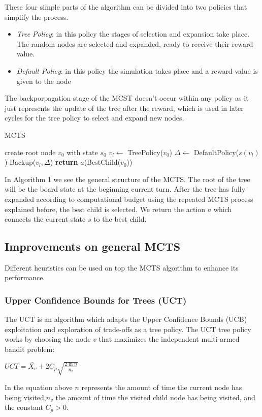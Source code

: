 \documentclass{ba-kecs}
\begin{document}
These four simple parts of the algorithm can be divided into two policies that simplify the process.
\begin{itemize}
\item \textit{Tree Policy}: in this policy the stages of selection and expansion take place. The random nodes are selected and expanded, ready to receive their reward value.
\item \textit{Default Policy}: in this policy the simulation takes place and a reward value is given to the node 
\end{itemize}
The backporpagation stage of the MCST doesn't occur within any policy as it just represents the update of the tree after the reward, which is used in later cycles for the tree policy to select and expand new nodes.

\begin{algorithm}
    \caption{MCTS}
    \label{MCTS}
    \begin{algorithmic}
            \State create root node $v_0$ with state $s_0$
                \State $v_l \gets$ TreePolicy($v_0$)
                \State $ \Delta \gets$ DefaultPolicy($s(v_l)$)
                \State Backup($v_l, \Delta$)
            \EndWhile\label{}
            \State \textbf{return} $a$(BestChild($v_0$))
        \EndProcedure
    \end{algorithmic}
\end{algorithm}

In Algorithm 1 we see the general structure of the MCTS. The root of the tree will be the board state at the beginning current turn. After the tree has fully expanded according to computational budget using the repeated MCTS process explained before, the best child is selected. We return the action $a$ which connects the current state $s$ to the best child.
\subsection{Improvements on general MCTS}
Different heuristics can be used on top the MCTS algorithm to enhance its performance.
\subsubsection{Upper Confidence Bounds for Trees (UCT)}
The UCT is an algorithm which adapts the Upper Confidence Bounds (UCB) exploitation and exploration of trade-offs as a tree policy. The UCT tree policy works by choosing the node $v$ that maximizes the independent multi-armed bandit problem:
\begin{center}
$UCT = \bar{X_v} + 2C_p \sqrt{\frac{2\ln n}{n_v}}$
\end{center}
In the equation above $n$ represents the amount of time the current node has being visited,$n_v$ the amount of time the visited child node has being visited, and the constant $C_p >0$.
\end{document}
